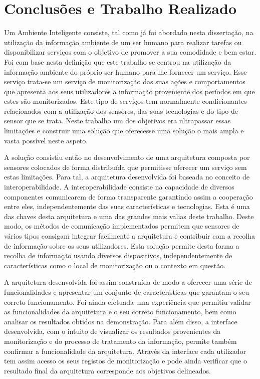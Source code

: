 \chapter{Conclusões e Trabalho Realizado}

Um Ambiente Inteligente consiste, tal como já foi abordado nesta dissertação, na utilização da informação ambiente de um ser humano para realizar tarefas ou disponibilizar serviços com o objetivo de promover a sua comodidade e bem estar. Foi com base nesta definição que este trabalho se centrou na utilização da informação ambiente do próprio ser humano para lhe fornecer um serviço. Esse serviço trata-se um serviço de monitorização das suas ações e comportamentos que apresenta aos seus utilizadores a informação proveniente dos períodos em que estes são monitorizados. Este tipo de serviços tem normalmente condicionantes relacionados com a utilização dos sensores, das suas tecnologias e do tipo de sensor que se trata. Neste trabalho um dos objetivos era ultrapassar essas limitações e construir uma solução que oferecesse uma solução o mais ampla e vasta possível neste aspeto.

A solução consistiu então no desenvolvimento de uma arquitetura composta por sensores colocados de forma distribuída que permitisse oferecer um serviço sem estas limitações. Para tal, a arquitetura desenvolvida foi baseada no conceito de interoperabilidade. A interoperabilidade consiste na capacidade de diversos componentes comunicarem de forma transparente garantindo assim a cooperação entre eles, independentemente das suas características e tecnologias. Esta é uma das chaves desta arquitetura e uma das grandes mais valias deste trabalho. Deste modo, os métodos de comunicação implementados permitem que sensores de vários tipos consigam integrar facilmente a arquitetura e contribuir com a recolha de informação sobre os seus utilizadores. Esta solução permite desta forma a recolha de informação usando diversos dispositivos, independentemente de características como o local de monitorização ou o contexto em questão.

A arquitetura desenvolvida foi assim construída de modo a oferecer uma série de funcionalidades e apresentar um conjunto de características que garantam o seu correto funcionamento. Foi ainda efetuada uma experiência que permitiu validar as funcionalidades da arquitetura e o seu correto funcionamento, bem como analisar os resultados obtidos na demonstração. Para além disso, a interface desenvolvida, com o intuito de visualizar os resultados provenientes da monitorização e do processo de tratamento da informação, permite também confirmar a funcionalidade da arquitetura. Através da interface cada utilizador tem assim acesso os seus registos de monitorização e pode ainda verificar que o resultado final da arquitetura corresponde aos objetivos delineados.


